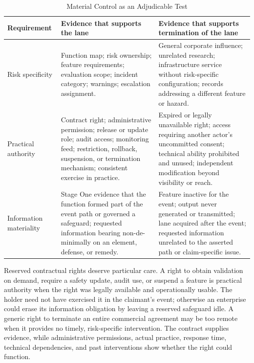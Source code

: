 \begin{table}[htbp]
\centering
\caption{Material Control as an Adjudicable Test}
\label{tab:material-control-proof}
\small
\begin{tabularx}{\textwidth}{>{\raggedright\arraybackslash}p{} >{\raggedright\arraybackslash}p{} X}
\toprule
Requirement & Evidence that supports the lane & Evidence that supports termination of the lane \\
\midrule
Risk specificity & Function map; risk ownership; feature requirements; evaluation scope; incident category; warnings; escalation assignment. & General corporate influence; unrelated research; infrastructure service without risk-specific configuration; records addressing a different feature or hazard. \\
Practical authority & Contract right; administrative permission; release or update role; audit access; monitoring feed; restriction, rollback, suspension, or termination mechanism; consistent exercise in practice. & Expired or legally unavailable right; access requiring another actor's uncommitted consent; technical ability prohibited and unused; independent modification beyond visibility or reach. \\
Information materiality & Stage One evidence that the function formed part of the event path or governed a safeguard; requested information bearing non-de-minimally on an element, defense, or remedy. & Feature inactive for the event; output never generated or transmitted; lane acquired after the event; requested information unrelated to the asserted path or claim-specific issue. \\
\bottomrule
\end{tabularx}
\end{table}

Reserved contractual rights deserve particular care. A right to obtain validation on demand, require a safety update, audit use, or suspend a feature is practical authority when the right was legally available and operationally usable. The holder need not have exercised it in the claimant's event; otherwise an enterprise could erase its information obligation by leaving a reserved safeguard idle. A generic right to terminate an entire commercial agreement may be too remote when it provides no timely, risk-specific intervention. The contract supplies evidence, while administrative permissions, actual practice, response time, technical dependencies, and past interventions show whether the right could function.

